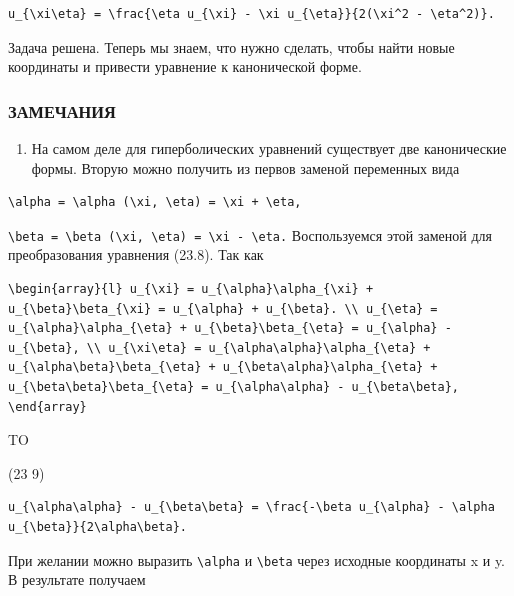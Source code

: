 \documentclass[
  ukrainian,
]{article}
\providecommand{\tightlist}{%
  \setlength{\itemsep}{0pt}\setlength{\parskip}{0pt}}
\begin{document}
\begin{verbatim}
u_{\xi\eta} = \frac{\eta u_{\xi} - \xi u_{\eta}}{2(\xi^2 - \eta^2)}.
\end{verbatim}

Задача решена. Теперь мы знаем, что нужно сделать, чтобы найти новые
координаты и привести уравнение к канонической форме.

\subsubsection{ЗАМЕЧАНИЯ}\label{ux437ux430ux43cux435ux447ux430ux43dux438ux44f-4}

\begin{enumerate}
\def\labelenumi{\arabic{enumi}.}
\tightlist
\item
  На самом деле для гиперболических уравнений существует две
  канонические формы. Вторую можно получить из первов заменой переменных
  вида
\end{enumerate}

\begin{verbatim}
\alpha = \alpha (\xi, \eta) = \xi + \eta,
\end{verbatim}

\texttt{\textbackslash{}beta\ =\ \textbackslash{}beta\ (\textbackslash{}xi,\ \textbackslash{}eta)\ =\ \textbackslash{}xi\ -\ \textbackslash{}eta.}
Воспользуемся этой заменой для преобразования уравнения (23.8). Так как

\begin{verbatim}
\begin{array}{l} u_{\xi} = u_{\alpha}\alpha_{\xi} + u_{\beta}\beta_{\xi} = u_{\alpha} + u_{\beta}. \\ u_{\eta} = u_{\alpha}\alpha_{\eta} + u_{\beta}\beta_{\eta} = u_{\alpha} - u_{\beta}, \\ u_{\xi\eta} = u_{\alpha\alpha}\alpha_{\eta} + u_{\alpha\beta}\beta_{\eta} + u_{\beta\alpha}\alpha_{\eta} + u_{\beta\beta}\beta_{\eta} = u_{\alpha\alpha} - u_{\beta\beta}, \end{array}
\end{verbatim}

TO

(23 9)

\begin{verbatim}
u_{\alpha\alpha} - u_{\beta\beta} = \frac{-\beta u_{\alpha} - \alpha u_{\beta}}{2\alpha\beta}.
\end{verbatim}

При желании можно выразить \texttt{\textbackslash{}alpha} и
\texttt{\textbackslash{}beta} через исходные координаты x и y. В
результате получаем
\end{document}
